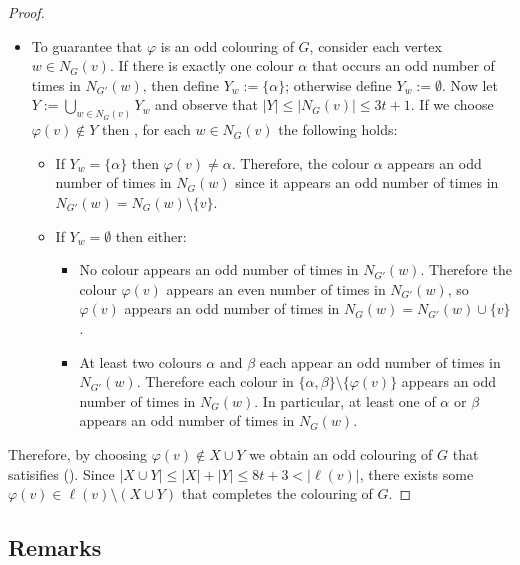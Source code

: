 \documentclass{patmorin}
\begin{document}
\begin{proof}
\begin{itemize}
    \item To guarantee that $\varphi$ is an odd colouring of $G$, consider each vertex $w\in N_{G}(v)$.  If there is exactly one colour $\alpha$ that occurs an odd number of times in $N_{G'}(w)$, then define $Y_{w} := \{\alpha\}$; otherwise define $Y_{w}:=\emptyset$. Now let $Y:=\bigcup_{w\in N_{G}(v)} Y_{w}$ and observe that $|Y|\le |N_G(v)|\le 3t+1$.
    If we choose $\varphi(v)\not\in Y$ then , for each $w\in N_{G}(v)$ the following holds:
    \begin{itemize}
      \item If $Y_{w}=\{\alpha\}$ then $\varphi(v)\neq\alpha$. Therefore, the colour $\alpha$ appears an odd number of times in $N_{G}(w)$ since it appears an odd number of times in $N_{G'}(w)=N_G(w)\setminus\{v\}$.
      \item If $Y_{w}=\emptyset$ then either:
      \begin{itemize}
        \item No colour appears an odd number of times in $N_{G'}(w)$.  Therefore the colour $\varphi(v)$ appears an even number of times in $N_{G'}(w)$, so $\varphi(v)$ appears an odd number of times in $N_G(w)=N_{G'}(w)\cup\{v\}$.
        \item At least two colours $\alpha$ and $\beta$ each appear an odd number of times in $N_{G'}(w)$.  Therefore each colour in $\{\alpha,\beta\}\setminus\{\varphi(v)\}$ appears an odd number of times in $N_{G}(w)$.  In particular, at least one of $\alpha$ or $\beta$ appears an odd number of times in $N_G(w)$.
      \end{itemize}
    \end{itemize}
  \end{itemize}
  Therefore, by choosing $\varphi(v)\not\in X\cup Y$ we obtain an odd colouring of $G$ that satisifies ().  Since $|X\cup Y|\le |X|+|Y|\le 8t+3 < |\ell(v)|$, there exists some $\varphi(v)\in\ell(v)\setminus(X\cup Y)$ that completes the colouring of $G$.
\end{proof}


\subsection{Remarks}

% 
\end{document}
